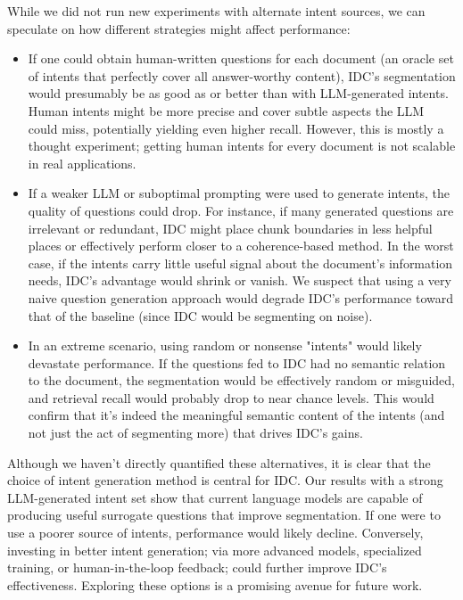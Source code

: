 \documentclass[12pt,a4paper]{report}
\begin{document}
While we did not run new experiments with alternate intent sources, we can speculate on how different strategies might affect performance:
\begin{itemize}
\item If one could obtain human-written questions for each document (an oracle set of intents that perfectly cover all answer-worthy content), IDC's segmentation would presumably be as good as or better than with LLM-generated intents. Human intents might be more precise and cover subtle aspects the LLM could miss, potentially yielding even higher recall. However, this is mostly a thought experiment; getting human intents for every document is not scalable in real applications.

\item If a weaker LLM or suboptimal prompting were used to generate intents, the quality of questions could drop. For instance, if many generated questions are irrelevant or redundant, IDC might place chunk boundaries in less helpful places or effectively perform closer to a coherence-based method. In the worst case, if the intents carry little useful signal about the document's information needs, IDC's advantage would shrink or vanish. We suspect that using a very naive question generation approach would degrade IDC's performance toward that of the baseline (since IDC would be segmenting on noise).

\item In an extreme scenario, using random or nonsense "intents" would likely devastate performance. If the questions fed to IDC had no semantic relation to the document, the segmentation would be effectively random or misguided, and retrieval recall would probably drop to near chance levels. This would confirm that it's indeed the meaningful semantic content of the intents (and not just the act of segmenting more) that drives IDC's gains.
\end{itemize}

Although we haven't directly quantified these alternatives, it is clear that the choice of intent generation method is central for IDC. Our results with a strong LLM-generated intent set show that current language models are capable of producing useful surrogate questions that improve segmentation. If one were to use a poorer source of intents, performance would likely decline. Conversely, investing in better intent generation; via more advanced models, specialized training, or human-in-the-loop feedback; could further improve IDC's effectiveness. Exploring these options is a promising avenue for future work.
\end{document}
